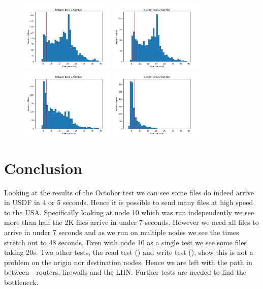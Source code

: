 \begin{figure}
\includegraphics[width=0.4\textwidth]{plots/lsstcam-dc07}
\includegraphics[width=0.4\textwidth]{plots/lsstcam-dc08}\\
\includegraphics[width=0.4\textwidth]{plots/lsstcam-dc09}
\includegraphics[width=0.4\textwidth]{plots/lsstcam-dc10}
\end{figure}

\section{Conclusion}
Looking at the results of the October test we can see some files do indeed arrive in USDF in 4 or 5 seconds.
Hence it is possible to send many files at high speed to the USA.
Specifically looking at node 10 which was run independently we see more than half the 2K files arrive in under 7 seconds.
However we need all files to arrive in under 7 seconds and as we run on multiple nodes we see the times stretch out to 48 seconds.
Even with node 10 as a single test we see some  files taking 20s.
Two other tests, the read test ()  and write test (),  show this is not a problem on the origin nor destination nodes.
Hence we are left with the path in between - routers, firewalls and the LHN.
Further tests are needed to find the bottleneck.


